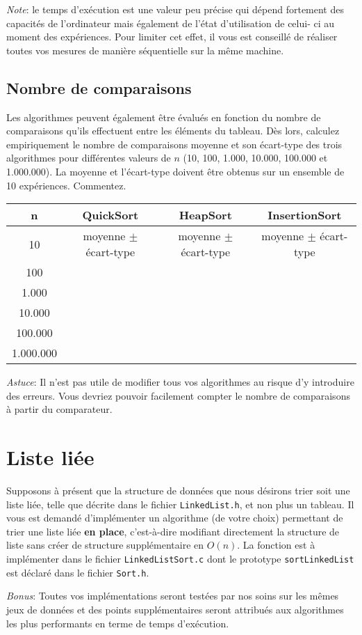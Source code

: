 \documentclass[a4paper,10pt]{article}
\begin{document}
{\em Note}: le temps d'exécution est une valeur peu précise qui dépend fortement
des capacités de l'ordinateur mais également de l'état d'utilisation de celui-
ci au moment des expériences. Pour limiter cet effet, il vous est conseillé
de réaliser toutes vos mesures de manière séquentielle sur la même machine.

\subsection{Nombre de comparaisons}

Les algorithmes peuvent également être évalués en fonction du nombre de
comparaisons qu'ils effectuent entre les éléments du tableau. Dès lors, calculez
empiriquement le nombre de comparaisons moyenne et son écart-type des trois
algorithmes pour différentes valeurs de $n$ (10, 100, 1.000, 10.000, 100.000 et
1.000.000). La moyenne et l'écart-type doivent être obtenus sur un ensemble de
10 expériences. Commentez.

\begin{center}
\begin{tabular}{cccc}
	\hline
	n & QuickSort & HeapSort & InsertionSort \\
	\hline
	10 & moyenne $\pm$ écart-type & moyenne $\pm$ écart-type & moyenne $\pm$ écart-type\\
	100 & & &\\
	1.000 & & &\\
	10.000 & & &\\
	100.000 & & &\\
	1.000.000 & & &\\
\end{tabular}
\end{center}

{\em Astuce}: Il n'est pas utile de modifier tous vos algorithmes au risque d'y
introduire des erreurs. Vous devriez pouvoir facilement compter le nombre de
comparaisons à partir du comparateur.

\section{Liste liée}

Supposons à présent que la structure de données que nous désirons
trier soit une liste liée, telle que décrite dans le fichier
\texttt{LinkedList.h}, et non plus un tableau. Il vous est demandé
d'implémenter un algorithme (de votre choix) permettant de trier une
liste liée {\bf en place}, c'est-à-dire modifiant directement la
structure de liste sans créer de structure supplémentaire en
$O(n)$. La fonction est à implémenter dans le fichier
\texttt{LinkedListSort.c} dont le prototype \texttt{sortLinkedList}
est déclaré dans le fichier \texttt{Sort.h}.

\textit{Bonus}: Toutes vos implémentations seront testées par nos soins
sur les mêmes jeux de données et des points supplémentaires seront
attribués aux algorithmes les plus performants en terme de temps
d'exécution.
\end{document}
